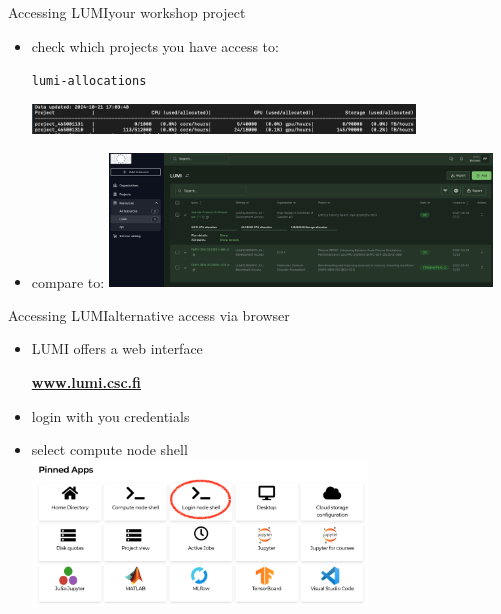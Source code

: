\documentclass[
  aspectratio=169,
  10pt
]{beamer}
\newcommand{\terminal}[1]{\par\noindent\colorbox{shadecolor}
{\parbox{\dimexpr\textwidth-2\fboxsep\relax}{\texttt{#1}}}}
\begin{document}
\begin{frame}[t,fragile]{Accessing LUMI}{your workshop project}

\begin{itemize}
    \item check which projects you have access to: 
    \terminal{lumi-allocations }
    \includegraphics[width=0.8\textwidth]{images/LUMI_projects2.png}
    \item compare to: \newline
    \includegraphics[width=0.8\textwidth]{images/LUMI_projects3.png}
\end{itemize}

\end{frame}

\begin{frame}[t,fragile]{Accessing LUMI}{alternative access via browser}

\begin{itemize}
    \item LUMI offers a web interface \begin{center}\textbf{\url{www.lumi.csc.fi}}\end{center}
    \item login with you credentials  
    \item select compute node shell
    \includegraphics[width=0.7\textwidth]{images/LUMI_web_shell2.png}
\end{itemize}

\end{frame}
\end{document}

